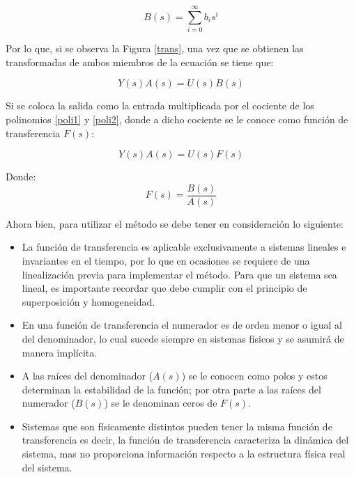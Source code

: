 \begin{equation}\label{poli2}
 B(s)=\sum_{i=0}^{\infty }b_{i}s^{i}
\end{equation}

Por lo que, si se observa la Figura \ref{trans}, una vez que se obtienen las transformadas de ambos miembros de la ecuación se tiene que:

\begin{equation}
    Y(s)A(s) = U(s)B(s)
\end{equation}

Si se coloca la salida como la entrada multiplicada por el cociente de los polinomios \ref{poli1} y \ref{poli2}, donde a dicho cociente se le conoce como función de transferencia $F(s)$: \cite{transferencia}

\begin{equation}
    Y(s)A(s) = U(s)F(s)
\end{equation}

Donde:
\begin{equation}
F(s)=\frac{B(s)}{A(s)}
\end{equation}

Ahora bien, para utilizar el método se debe tener en consideración lo siguiente:\cite{transferencia}

\begin{itemize}
    \item La función de transferencia es aplicable exclusivamente a sistemas lineales e invariantes en el tiempo, por lo que en ocasiones se requiere de una linealización previa para implementar el método. Para que un sistema sea lineal, es importante recordar que debe cumplir con el principio de superposición y homogeneidad.
    \item En una función de transferencia el numerador es de orden menor o igual al del denominador, lo cual sucede siempre en sistemas físicos y se asumirá de manera implícita.
    \item A las raíces del denominador ($A(s)$) se le conocen como polos y estos determinan la estabilidad de la función; por otra parte a las raíces del numerador ($B(s)$) se le denominan ceros de $F(s)$.
    \item Sistemas que son físicamente distintos pueden tener la misma función de transferencia es decir, la función de transferencia caracteriza la dinámica del sistema, mas no proporciona información respecto a la estructura física real del sistema. 
\end{itemize}

